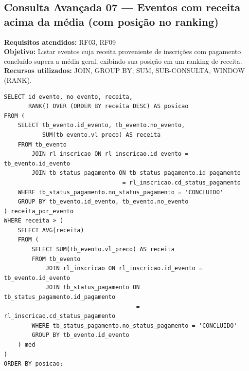 \documentclass[12pt]{article}
\begin{document}
\subsection{Consulta Avançada 07 --- Eventos com receita acima da média (com posição no ranking)}
\textbf{Requisitos atendidos:} RF03, RF09 \\
\textbf{Objetivo:} Listar eventos cuja receita proveniente de inscrições com pagamento concluído supera a média geral, exibindo sua posição em um ranking de receita. \\
\textbf{Recursos utilizados:} JOIN, GROUP BY, SUM, SUB-CONSULTA, WINDOW (RANK).
\begin{lstlisting}[caption={QA07 --- Eventos com receita acima da média.}]
SELECT id_evento, no_evento, receita,
       RANK() OVER (ORDER BY receita DESC) AS posicao
FROM (
    SELECT tb_evento.id_evento, tb_evento.no_evento,
           SUM(tb_evento.vl_preco) AS receita
    FROM tb_evento
        JOIN rl_inscricao ON rl_inscricao.id_evento = tb_evento.id_evento
        JOIN tb_status_pagamento ON tb_status_pagamento.id_pagamento
                                  = rl_inscricao.cd_status_pagamento
    WHERE tb_status_pagamento.no_status_pagamento = 'CONCLUIDO'
    GROUP BY tb_evento.id_evento, tb_evento.no_evento
) receita_por_evento
WHERE receita > (
    SELECT AVG(receita)
    FROM (
        SELECT SUM(tb_evento.vl_preco) AS receita
        FROM tb_evento
            JOIN rl_inscricao ON rl_inscricao.id_evento = tb_evento.id_evento
            JOIN tb_status_pagamento ON tb_status_pagamento.id_pagamento
                                      = rl_inscricao.cd_status_pagamento
        WHERE tb_status_pagamento.no_status_pagamento = 'CONCLUIDO'
        GROUP BY tb_evento.id_evento
    ) med
)
ORDER BY posicao;
\end{lstlisting}
\end{document}
